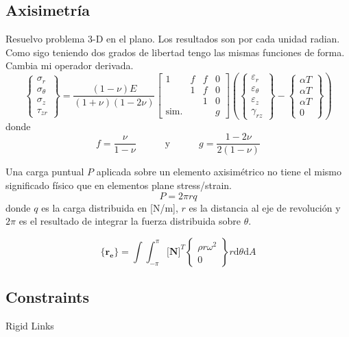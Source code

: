 \documentclass[11pt, a4paper,titlepage]{article}
\newcommand{\unspace}{\!\!\!\!\!\!\!\!\!\!\!\!\!\!\!\!\!\!\!\!}
\newcommand{\di}{\textrm{d}}
\newcommand{\Mme}[1]{\boldsymbol{[}\mathbf{#1} \boldsymbol{]}}
\newcommand{\Cme}[1]{\boldsymbol{\{ }\mathbf{#1} \boldsymbol{\}} }
\newcommand{\MN}{\Mme{N}}
\newcommand{\radial}{r}
\newcommand{\eff}{f}
\begin{document}
\subsection{Axisimetría}
Resuelvo problema 3-D en el plano. Los resultados son por cada unidad radian. Como sigo teniendo dos grados de libertad tengo las mismas funciones de forma. Cambia mi operador derivada.
\[
\begin{Bmatrix}
    \sigma_\radial \\
    \sigma_\theta \\
    \sigma_z \\
    \tau_{z\radial}
\end{Bmatrix}
= \frac{(1-\nu)E}{(1+\nu)(1-2\nu)}
\begin{bmatrix}
   1 & \eff & \eff & 0 \\
    & 1 & \eff & 0 \\
    & & 1 & 0 \\
    \textrm{sim.}\unspace& & & g 
\end{bmatrix}
\left(
\begin{Bmatrix}
\varepsilon_\radial \\
\varepsilon_\theta \\
\varepsilon_z \\
\gamma_{\radial z}
\end{Bmatrix}
-
\begin{Bmatrix}
\alpha T\\
\alpha T \\
\alpha T \\
0
\end{Bmatrix}
\right)
\]
donde 
\[
f=\frac{\nu}{1-\nu}\qquad \quad \textrm{y}\quad \qquad g=\frac{1-2\nu}{2(1-\nu)}
\]

Una carga puntual $P$ aplicada sobre un elemento axisimétrico no tiene el mismo significado físico que en elementos plane stress/strain. 
\[
P=2\pi rq
\]
donde $q$ es la carga distribuida en [N/m], $r$ es la distancia al eje de revolución y $2 \pi$ es el resultado de integrar la fuerza distribuida sobre $\theta$. 

\[
\Cme{r_e} = \int\int_{-\pi}^{\pi} \MN^T \begin{Bmatrix}
    \rho r \omega ^2 \\
    0
\end{Bmatrix} r \di \theta \di A
\]

\subsection{Constraints}
Rigid Links
\end{document}
